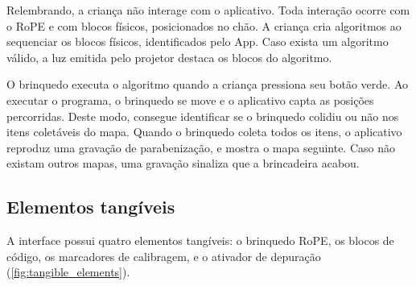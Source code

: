 Relembrando, a criança não interage com o aplicativo. Toda interação ocorre com o RoPE e com blocos físicos, posicionados no chão. A criança cria algoritmos ao sequenciar os blocos físicos, identificados pelo App. Caso exista um algoritmo válido, a luz emitida pelo projetor destaca os blocos do algoritmo.

O brinquedo executa o algoritmo quando a criança pressiona seu botão verde. Ao executar o programa, o brinquedo se move e o aplicativo capta as posições percorridas. Deste modo, consegue identificar se o brinquedo colidiu ou não nos itens coletáveis do mapa. Quando o brinquedo coleta todos os itens, o aplicativo reproduz uma gravação de parabenização, e mostra o mapa seguinte. Caso não existam outros mapas, uma gravação sinaliza que a brincadeira acabou.

\subsection{Elementos tangíveis}
A interface possui quatro elementos tangíveis: o brinquedo RoPE, os blocos de código, os marcadores de calibragem, e o ativador de depuração  (\autoref{fig:tangible_elements}).
